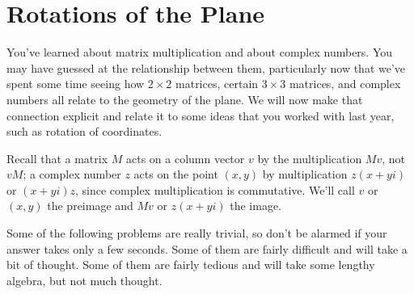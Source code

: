 \documentclass[../textbook.tex]{subfiles}
\begin{document}
\section{Rotations of the Plane}

You've learned about matrix multiplication and about complex numbers. You may have guessed at the relationship between them, particularly now that we've spent some time seeing how $2\times 2$ matrices, certain $3\times 3$ matrices, and complex numbers all relate to the geometry of the plane. We will now make that connection explicit and relate it to some ideas that you worked with last year, such as rotation of coordinates.

Recall that a matrix $M$ acts on a column vector $v$ by the multiplication $Mv$, not $vM$; a complex number $z$ acts on the point $(x,y)$ by multiplication $z(x+yi)$ or $(x+yi)z$, since complex multiplication is commutative. We'll call $v$ or $(x,y)$ the preimage and $Mv$ or $z(x+yi)$ the image.

Some of the following problems are really trivial, so don't be alarmed if your answer takes only a few seconds. Some of them are fairly difficult and will take a bit of thought. Some of them are fairly tedious and will take some lengthy algebra, but not much thought.

\newcommand{\Mat}{\operatorname{M}}
\end{document}
